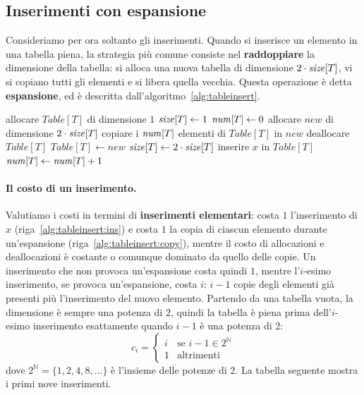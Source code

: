 \subsection{Inserimenti con espansione}\label{sec:tabelle-ins}
Consideriamo per ora soltanto gli inserimenti. Quando si inserisce un elemento in una tabella piena, la strategia più comune consiste nel \textbf{raddoppiare} la dimensione della tabella: si alloca una nuova tabella di dimensione $2\cdot\mathit{size}[T]$, vi si copiano tutti gli elementi e si libera quella vecchia. Questa operazione è detta \textbf{espansione}, ed è descritta dall'algoritmo~\ref{alg:tableinsert}.

\begin{algorithm}[htbp]
\caption{L'operazione $\TableInsert(T,x)$ alloca la tabella al primo inserimento e la raddoppia (espansione) quando è piena, copiando tutti gli elementi nella nuova tabella prima di inserire $x$.}\label{alg:tableinsert}
\begin{algorithmic}[1]
    \State allocare $\mathit{Table}[T]$ di dimensione $1$
    \State $\mathit{size}[T] \gets 1$
    \State $\mathit{num}[T] \gets 0$
  \ElsIf{$\tnum[T] = \tsize[T]$}
    \State allocare $\mathit{new}$ di dimensione $2\cdot\mathit{size}[T]$
    \State copiare i $\mathit{num}[T]$ elementi di $\mathit{Table}[T]$ in $\mathit{new}$\label{alg:tableinsert:copy}
    \State deallocare $\mathit{Table}[T]$
    \State $\mathit{Table}[T] \gets \mathit{new}$
    \State $\mathit{size}[T] \gets 2\cdot\mathit{size}[T]$
  \EndIf
  \State inserire $x$ in $\mathit{Table}[T]$\label{alg:tableinsert:ins}
  \State $\mathit{num}[T] \gets \mathit{num}[T] + 1$
\EndProcedure
\end{algorithmic}
\end{algorithm}

\paragraph{Il costo di un inserimento.}
Valutiamo i costi in termini di \textbf{inserimenti elementari}: costa $1$ l'inserimento di $x$ (riga~\ref{alg:tableinsert:ins}) e costa $1$ la copia di ciascun elemento durante un'espansione (riga~\ref{alg:tableinsert:copy}), mentre il costo di allocazioni e deallocazioni è costante o comunque dominato da quello delle copie. Un inserimento che non provoca un'espansione costa quindi $1$, mentre l'$i$-esimo inserimento, se provoca un'espansione, costa $i$: $i-1$ copie degli elementi già presenti più l'inserimento del nuovo elemento. Partendo da una tabella vuota, la dimensione è sempre una potenza di $2$, quindi la tabella è piena prima dell'$i$-esimo inserimento esattamente quando $i-1$ è una potenza di $2$:
\[
c_i = \begin{cases} i & \text{se } i-1 \in 2^{\mathbb{N}} \\ 1 & \text{altrimenti} \end{cases}
\]
dove $2^{\mathbb{N}} = \{1, 2, 4, 8, \dots\}$ è l'insieme delle potenze di $2$. La tabella seguente mostra i primi nove inserimenti.

